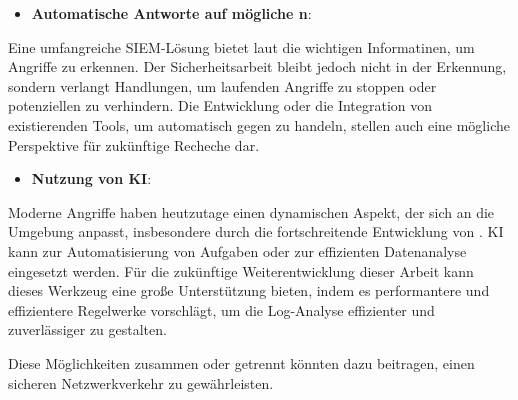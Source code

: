 \begin{itemize}[noitemsep]
    \item \textbf{Automatische Antworte auf mögliche n}:
\end{itemize}

Eine umfangreiche \gls{SIEM}-Lösung bietet laut \cite{Mohammed_NOC} die wichtigen Informatinen, um Angriffe zu erkennen. Der Sicherheitsarbeit bleibt jedoch nicht in der Erkennung, sondern verlangt Handlungen, um laufenden Angriffe zu stoppen oder potenziellen zu verhindern. Die Entwicklung oder die Integration von existierenden Tools, um automatisch gegen  zu handeln, stellen auch eine mögliche Perspektive für zukünftige Recheche dar.

\begin{itemize}[noitemsep]
    \item \textbf{Nutzung von \gls{KI}}:
\end{itemize}

Moderne Angriffe haben  heutzutage einen dynamischen Aspekt, der sich an die Umgebung anpasst, insbesondere durch die fortschreitende Entwicklung von  \citep{Guembe_AIHACKER}. \gls{KI} kann zur Automatisierung von Aufgaben oder zur effizienten Datenanalyse eingesetzt werden. Für die zukünftige Weiterentwicklung dieser Arbeit kann dieses Werkzeug eine große Unterstützung bieten, indem es performantere und effizientere Regelwerke vorschlägt, um die Log-Analyse effizienter und zuverlässiger zu gestalten. 

Diese Möglichkeiten zusammen oder getrennt könnten dazu beitragen, einen sicheren Netzwerkverkehr zu gewährleisten.